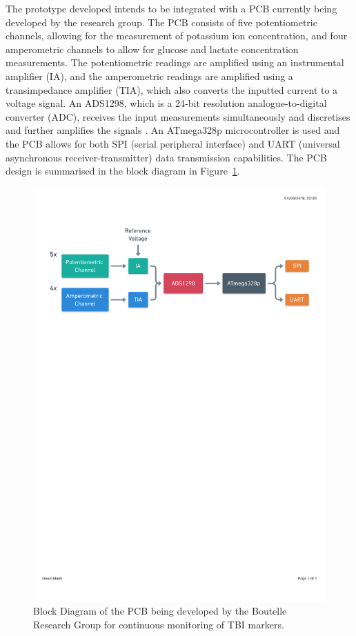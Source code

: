 The prototype developed intends to be integrated with a PCB currently being developed by the research group. The PCB consists of five potentiometric channels, allowing for the measurement of potassium ion concentration, and four amperometric channels to allow for glucose and lactate concentration measurements. The potentiometric readings are amplified using an instrumental amplifier (IA), and the amperometric readings are amplified using a transimpedance amplifier (TIA), which also converts the inputted current to a voltage signal. An ADS1298, which is a 24-bit resolution analogue-to-digital converter (ADC), receives the input measurements simultaneously and discretises and further amplifies the signals \cite{TexasInstruments2010}. An ATmega328p microcontroller is used and the PCB allows for both SPI (serial peripheral interface) and UART (universal asynchronous receiver-transmitter) data transmission capabilities. The PCB design is summarised in the block diagram in Figure~\ref{fig: PCB block diagram}.

\begin{figure}[h!]
\centering
\includegraphics[trim={0cm 20.5cm 0.5cm  2.9cm}, clip, width=1\textwidth]{./figures/CircuitBlockDiagram.pdf}
\captionsetup{justification=centering}
\caption{Block Diagram of the PCB being developed by the Boutelle Research Group for continuous monitoring of TBI markers.}
\label{fig: PCB block diagram}
\end{figure}

